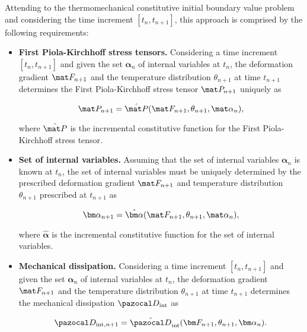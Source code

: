 Attending to the thermomechanical constitutive initial boundary value problem and considering the time increment $[t_n, t_{n+1}]$, this approach is comprised by the following requirements:
\begin{itemize}
    \item \textbf{First Piola-Kirchhoff stress tensors.} Considering a time increment $[t_n, t_{n+1}]$ and given the set $\bm \alpha_n$ of internal variables at $t_n$, the deformation gradient $\mat F_{n+1}$ and the temperature distribution \(\theta_{n+1}\) at time $t_{n+1}$ determines the First Piola-Kirchhoff stress tensor $\mat P_{n+1}$ uniquely as
    \begin{highlight}
      \begin{equation}
          \mat P_{n+1} = \hat{\mat P}(\mat F_{n+1}, \theta_{n+1}, \mat \alpha_n),
      \end{equation}
    \end{highlight}
    where $\hat{\mat P}$ is the incremental constitutive function for the First Piola-Kirchhoff stress tensor.
    \item \textbf{Set of internal variables.} Assuming that the set of internal variables $\bm \alpha_n$ is known at $t_n$, the set of internal variables must be uniquely determined by the prescribed deformation gradient $\mat F_{n+1}$ and temperature distribution \(\theta_{n+1}\) prescribed at $t_{n+1}$ as
    \begin{highlight}
        \begin{equation}
             \bm \alpha_{n+1} =\hat{\bm \alpha}(\mat F_{n+1}, \theta_{n+1}, \mat \alpha_n), \label{eq:incremental_flux}
        \end{equation}
    \end{highlight}
    where $\hat{\bm \alpha}$ is the incremental constitutive function for the set of internal variables.

    \item \textbf{Mechanical dissipation.}
 Considering a time increment $[t_n, t_{n+1}]$ and given the set $\bm \alpha_n$ of internal variables at $t_n$, the deformation gradient $\mat F_{n+1}$ and the temperature distribution \(\theta_{n+1}\) at time $t_{n+1}$ determines the mechanical dissipation \(\pazocal D_\text{int}\) as
    \begin{highlight}
    \begin{equation}
    \pazocal D_{\text{int},n+1} = \hat{\pazocal D}_\text{int}(\bm F_{n+1}, \theta_{n+1}, \bm \alpha_n).
    \end{equation}
    \end{highlight}


\end{itemize}
